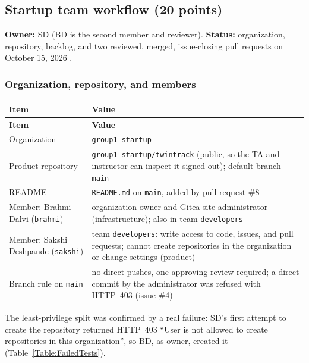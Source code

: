 \subsection{Startup team workflow (20 points)}
\label{Section:giteaWorkflow}
\textbf{Owner:} SD (BD is the second member and reviewer). \textbf{Status:}
organization, repository, backlog, and two reviewed, merged, issue-closing
pull requests on October 15, 2026 \StatusPass.

\subsubsection{Organization, repository, and members}
\begin{tabularx}{\linewidth}{L{3.6cm}Y}
\caption{Startup organization and members\label{Table:GiteaOrg}}\\
\toprule \textbf{Item} & \textbf{Value}\\ \midrule
\endfirsthead
\toprule \textbf{Item} & \textbf{Value}\\ \midrule
\endhead \bottomrule \endlastfoot
Organization & \href{https://git.ssw590-g1.tech/group1-startup}{\texttt{group1-startup}}\\
Product repository & \href{https://git.ssw590-g1.tech/group1-startup/twintrack}{\texttt{group1-startup/twintrack}} (public, so the TA and instructor can inspect it signed out); default branch \texttt{main}\\
README & \href{https://git.ssw590-g1.tech/group1-startup/twintrack/src/branch/main/README.md}{\texttt{README.md}} on \texttt{main}, added by pull request \#8\\
Member: Brahmi Dalvi (\texttt{brahmi}) & organization owner and Gitea site administrator (infrastructure); also in team \texttt{developers}\\
Member: Sakshi Deshpande (\texttt{sakshi}) & team \texttt{developers}: write access to code, issues, and pull requests; cannot create repositories in the organization or change settings (product)\\
Branch rule on \texttt{main} & no direct pushes, one approving review required; a direct commit by the administrator was refused with HTTP~403 (issue \#4)\\
\end{tabularx}
The least-privilege split was confirmed by a real failure: SD's first attempt
to create the repository returned HTTP~403 ``User is not allowed to create
repositories in this organization'', so BD, as owner, created it
(Table~\ref{Table:FailedTests}).

